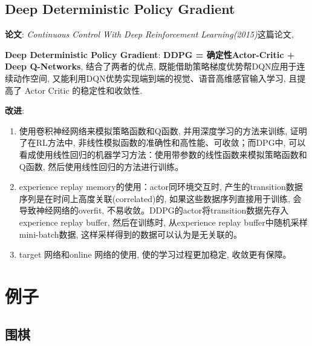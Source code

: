 \documentclass{article}
\newcommand{\env}[2]{\begin{#1}#2\end{#1}}
\begin{document}
        
    \subsection{Deep Deterministic Policy Gradient}
        \textbf{论文}: \textit{Continuous Control With Deep Reinforcement Learning(2015)}这篇论文, 
        
        \textbf{Deep Deterministic Policy Gradient}: \textbf{DDPG = 确定性Actor-Critic + Deep Q-Networks}, 结合了两者的优点, 既能借助策略梯度优势帮DQN应用于连续动作空间, 又能利用DQN优势实现端到端的视觉、语音高维感官输入学习, 且提高了 Actor Critic 的稳定性和收敛性.
        
        \textbf{改进}:
        \env{enumerate}{
            \item 使用卷积神经网络来模拟策略函数和Q函数, 并用深度学习的方法来训练, 证明了在RL方法中, 非线性模拟函数的准确性和高性能、可收敛；而DPG中, 可以看成使用线性回归的机器学习方法：使用带参数的线性函数来模拟策略函数和Q函数, 然后使用线性回归的方法进行训练。
            \item experience replay memory的使用：actor同环境交互时, 产生的transition数据序列是在时间上高度关联(correlated)的, 如果这些数据序列直接用于训练, 会导致神经网络的overfit, 不易收敛。DDPG的actor将transition数据先存入experience replay buffer, 然后在训练时, 从experience replay buffer中随机采样mini-batch数据, 这样采样得到的数据可以认为是无关联的。
            \item target 网络和online 网络的使用,  使的学习过程更加稳定, 收敛更有保障。
        }
    
   
\section{例子}
    \subsection{围棋}
\end{document}
